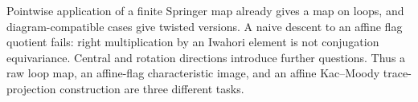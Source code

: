 Pointwise application of a finite Springer map already gives a map on loops, and diagram-compatible cases give twisted versions. A naive descent to an affine flag quotient fails: right multiplication by an Iwahori element is not conjugation equivariance. Central and rotation directions introduce further questions. Thus a raw loop map, an affine-flag characteristic image, and an affine Kac--Moody trace-projection construction are three different tasks.

